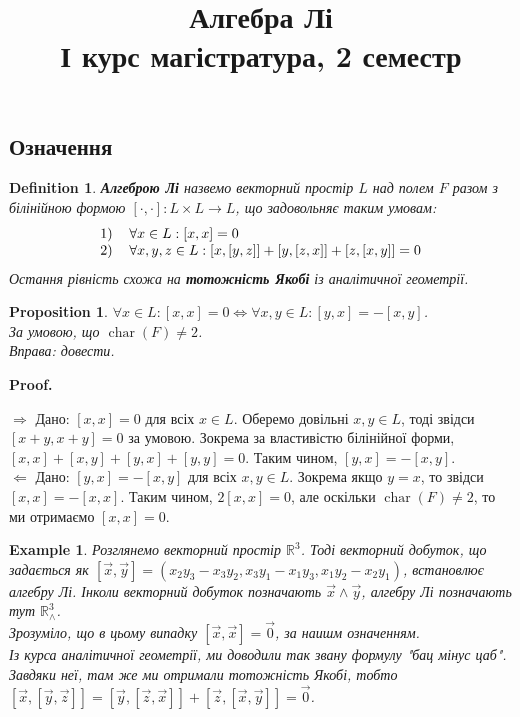 \documentclass[a4paper, 10pt]{article}
\title{Алгебра Лі \\ І курс магістратура, 2 семестр}
\makeatletter
\def\rightproof{$\boxed{\Rightarrow}$ }
\def\leftproof{$\boxed{\Leftarrow}$ }
\theoremstyle{theoremdd}
\newtheorem{definition}[theorem]{Definition}
\newtheorem{example}[theorem]{Example}
\newtheorem{proposition}[theorem]{Proposition}
\DeclareMathOperator{\charac}{char}
\renewenvironment{proof}[1][Proof.\\]{\par
\pushQED{\hfill \qed}%
\normalfont \topsep6\p@\@plus6\p@\relax
\trivlist
\item\relax
{\bfseries
#1\@addpunct{.}}\hspace\labelsep\ignorespaces
}{%
\popQED\endtrivlist\@endpefalse
}
\makeatother
\begin{document}
\maketitle
\newpage
\subsection{Означення}
\begin{definition}
\textbf{Алгеброю Лі} назвемо векторний простір $L$ над полем $F$ разом з білінійною формою $[\cdot,\cdot] \colon L \times L \to L$, що задовольняє таким умовам:
\begin{align*}
\begin{tabular}{ll}
1) & $\forall x \in L: [x,x] = 0$ \\
2) & $\forall x,y,z \in L: [x,[y,z]] + [y,[z,x]] + [z,[x,y]] = 0$
\end{tabular}
\end{align*}
Остання рівність схожа на \textbf{тотожність Якобі} із аналітичної геометрії.
\end{definition}

\begin{proposition}
$\forall x \in L: [x,x] = 0 \iff \forall x,y \in L: [y,x] = -[x,y]$.\\
За умовою, що $\charac(F) \neq 2$.\\
\textit{Вправа: довести.}
\end{proposition}

\begin{proof}
\rightproof Дано: $[x,x] = 0$ для всіх $x \in L$. Оберемо довільні $x,y \in L$, тоді звідси $[x+y,x+y] = 0$ за умовою. Зокрема за властивістю білінійної форми, $[x,x] + [x,y] + [y,x] + [y,y] = 0$. Таким чином, $[y,x] = -[x,y]$.
\bigskip \\
\leftproof Дано: $[y,x] = -[x,y]$ для всіх $x,y \in L$. Зокрема якщо $y = x$, то звідси $[x,x] = -[x,x]$. Таким чином, $2[x,x] = 0$, але оскільки $\charac(F) \neq 2$, то ми отримаємо $[x,x] = 0$.
\end{proof}

\begin{example}
Розглянемо векторний простір $\mathbb{R}^3$. Тоді векторний добуток, що задається як $[\vec{x},\vec{y}] = (x_2y_3-x_3y_2, x_3y_1 - x_1y_3, x_1y_2-x_2y_1)$, встановлює алгебру Лі. Інколи векторний добуток позначають $\vec{x} \wedge \vec{y}$, алгебру Лі позначають тут $\mathbb{R}^3_{\wedge}$.\\
Зрозуміло, що в цьому випадку $[\vec{x},\vec{x}] = \vec{0}$, за наишм означенням.\\
Із курса аналітичної геометрії, ми доводили так звану формулу "бац мінус цаб". Завдяки неї, там же ми отримали тотожність Якобі, тобто $[\vec{x},[\vec{y},\vec{z}]] = [\vec{y},[\vec{z},\vec{x}]] + [\vec{z},[\vec{x},\vec{y}]] = \vec{0}$.
\end{example}
\end{document}
